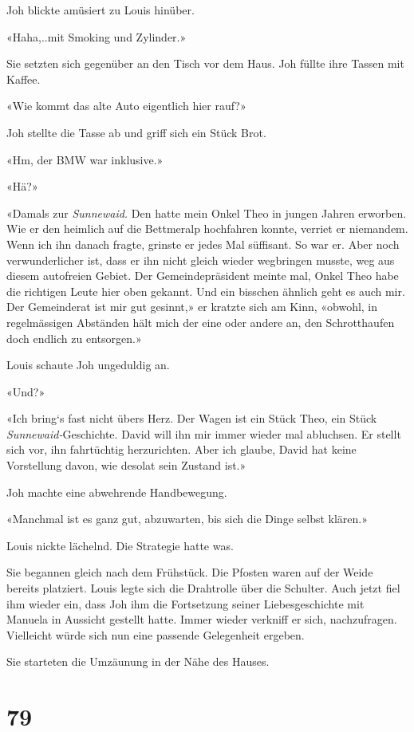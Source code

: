 Joh blickte amüsiert zu Louis hinüber.

«Haha,..mit Smoking und Zylinder.»

Sie setzten sich gegenüber an den Tisch vor dem Haus. Joh füllte ihre
Tassen mit Kaffee.

«Wie kommt das alte Auto eigentlich hier rauf?»

Joh stellte die Tasse ab und griff sich ein Stück Brot.

«Hm, der BMW war inklusive.»

«Hä?»

«Damals zur \emph{Sunnewaid.} Den hatte mein Onkel Theo in jungen Jahren
erworben. Wie er den heimlich auf die Bettmeralp hochfahren konnte,
verriet er niemandem. Wenn ich ihn danach fragte, grinste er jedes Mal
süffisant. So war er. Aber noch verwunderlicher ist, dass er ihn nicht
gleich wieder wegbringen musste, weg aus diesem autofreien Gebiet. Der
Gemeindepräsident meinte mal, Onkel Theo habe die richtigen Leute hier
oben gekannt. Und ein bisschen ähnlich geht es auch mir. Der Gemeinderat
ist mir gut gesinnt,» er kratzte sich am Kinn, «obwohl, in regelmässigen
Abständen hält mich der eine oder andere an, den Schrotthaufen doch
endlich zu entsorgen.»

Louis schaute Joh ungeduldig an.

«Und?»

«Ich bring`s fast nicht übers Herz. Der Wagen ist ein Stück Theo, ein
Stück \emph{Sunnewaid-}Geschichte. David will ihn mir immer wieder mal
abluchsen. Er stellt sich vor, ihn fahrtüchtig herzurichten. Aber ich
glaube, David hat keine Vorstellung davon, wie desolat sein Zustand
ist.»

Joh machte eine abwehrende Handbewegung.

«Manchmal ist es ganz gut, abzuwarten, bis sich die Dinge selbst
klären.»

Louis nickte lächelnd. Die Strategie hatte was.

Sie begannen gleich nach dem Frühstück. Die Pfosten waren auf der Weide
bereits platziert. Louis legte sich die Drahtrolle über die Schulter.
Auch jetzt fiel ihm wieder ein, dass Joh ihm die Fortsetzung seiner
Liebesgeschichte mit Manuela in Aussicht gestellt hatte. Immer wieder
verkniff er sich, nachzufragen. Vielleicht würde sich nun eine passende
Gelegenheit ergeben.

Sie starteten die Umzäunung in der Nähe des Hauses.

\chapter{79}\label{section-79}

